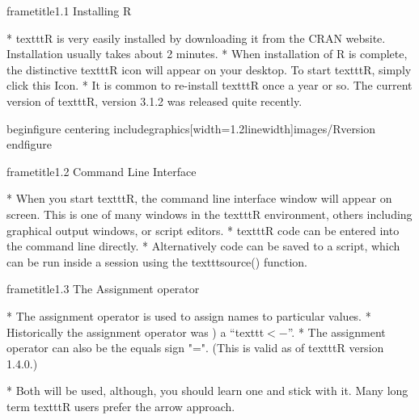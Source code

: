  	
 	
 		frametitle{1.1 Installing R}
 		
 			         * texttt{R} is very easily installed by downloading it from the CRAN website. Installation usually takes
 			about 2 minutes. 
 			         * When installation of R is complete, the distinctive texttt{R} icon will appear on your
 			desktop. To start texttt{R}, simply click this Icon. 
 			         * It is common to re-install texttt{R} once a year or so. The
 			current version of texttt{R}, version 3.1.2 was released quite recently.
 		
 		
 	
 	
 	
 	
 		begin{figure}
 			centering
 			includegraphics[width=1.2linewidth]{images/Rversion}        
 		end{figure}
 	  
 	
 		
 		frametitle{1.2 Command Line Interface}
 		
 			         * When you start texttt{R}, the command line interface window will appear on screen. This is one
 			of many windows in the texttt{R} environment, others including graphical output windows, or script
 			editors. 
 			         * texttt{R} code can be entered into the command line directly. 
 			         * Alternatively code can be saved
 			to a script, which can be run inside a session using the texttt{source()} function.
 		
 	
 	
 		frametitle{1.3 The Assignment operator}
 		
 			         * The assignment operator is used to assign names to particular values. 
 			         * Historically the assignment
 			operator was ) a ``texttt{$<-$}”. 
 			         * The assignment operator can also be the equals sign "=". (This is valid as of texttt{R}
 			version 1.4.0.)
 			
 			         * Both will be used, although, you should learn one and stick with it. Many long term texttt{R}
 			users prefer the arrow approach. 
 		
